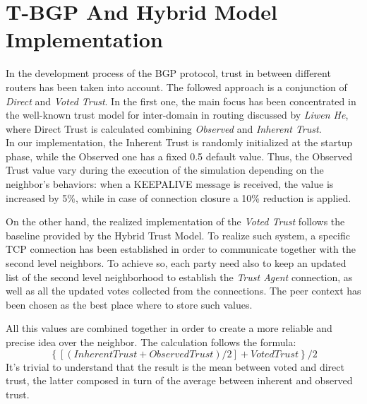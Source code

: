 \section{T-BGP And Hybrid Model Implementation}\label{BGPTrust}
In the development process of the BGP protocol, trust in between different routers has been taken into account. The followed approach is a conjunction of \textit{Direct} and \textit{Voted Trust}. In the first one, the main focus has been concentrated in the well-known trust model for inter-domain in routing\cite{he2006novel} discussed by \textit{Liwen He}, where Direct Trust is calculated combining \textit{Observed} and \textit{Inherent Trust}.\\
In our implementation, the Inherent Trust is randomly initialized at the startup phase, while the Observed one has a fixed 0.5 default value. Thus, the Observed Trust value vary during the execution of the simulation depending on the neighbor's behaviors: when a KEEPALIVE message is received, the value is increased by 5\%, while in case of connection closure a 10\% reduction is applied.

On the other hand, the realized implementation of the \textit{Voted Trust} follows the baseline provided by the Hybrid Trust Model\cite{rantala2011hybrid}. To realize such system, a specific TCP connection has been established in order to communicate together with the second level neighbors. To achieve so, each party need also to keep an updated list of the second level neighborhood to establish the \textit{Trust Agent} connection, as well as all the updated votes collected from the connections. The peer context has been chosen as the best place where to store such values.

All this values are combined together in order to create a more reliable and precise idea over the neighbor. The calculation follows the formula:
$$ \left\{[(Inherent Trust + Observed Trust) / 2 ] + Voted Trust \right\} / 2 $$
It's trivial to understand that the result is the mean between voted and direct trust, the latter composed in turn of the average between inherent and observed trust.

